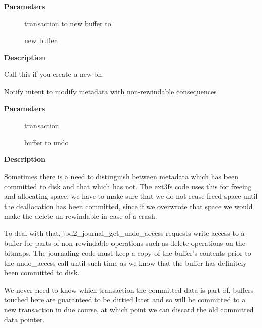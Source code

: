 \documentclass[a4paper,8pt,english]{sphinxmanual}
\begin{document}
\textbf{Parameters}
\begin{description}
\item[{}] \leavevmode
transaction to new buffer to

\item[{}] \leavevmode
new buffer.

\end{description}

\textbf{Description}

Call this if you create a new bh.

\begin{fulllineitems}
\label{filesystems/index:c.jbd2_journal_get_undo_access}
Notify intent to modify metadata with non-rewindable consequences

\end{fulllineitems}


\textbf{Parameters}
\begin{description}
\item[{}] \leavevmode
transaction

\item[{}] \leavevmode
buffer to undo

\end{description}

\textbf{Description}

Sometimes there is a need to distinguish between metadata which has
been committed to disk and that which has not.  The ext3fs code uses
this for freeing and allocating space, we have to make sure that we
do not reuse freed space until the deallocation has been committed,
since if we overwrote that space we would make the delete
un-rewindable in case of a crash.

To deal with that, jbd2\_journal\_get\_undo\_access requests write access to a
buffer for parts of non-rewindable operations such as delete
operations on the bitmaps.  The journaling code must keep a copy of
the buffer's contents prior to the undo\_access call until such time
as we know that the buffer has definitely been committed to disk.

We never need to know which transaction the committed data is part
of, buffers touched here are guaranteed to be dirtied later and so
will be committed to a new transaction in due course, at which point
we can discard the old committed data pointer.
\end{document}
